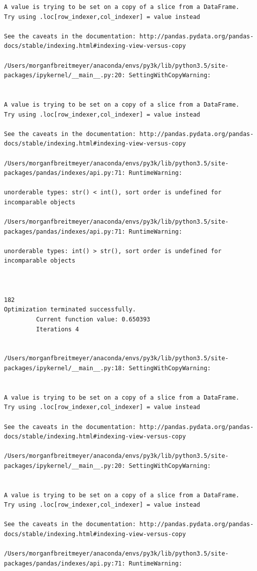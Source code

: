\begin{lstlisting}
A value is trying to be set on a copy of a slice from a DataFrame.
Try using .loc[row_indexer,col_indexer] = value instead

See the caveats in the documentation: http://pandas.pydata.org/pandas-docs/stable/indexing.html#indexing-view-versus-copy

/Users/morganfbreitmeyer/anaconda/envs/py3k/lib/python3.5/site-packages/ipykernel/__main__.py:20: SettingWithCopyWarning:


A value is trying to be set on a copy of a slice from a DataFrame.
Try using .loc[row_indexer,col_indexer] = value instead

See the caveats in the documentation: http://pandas.pydata.org/pandas-docs/stable/indexing.html#indexing-view-versus-copy

/Users/morganfbreitmeyer/anaconda/envs/py3k/lib/python3.5/site-packages/pandas/indexes/api.py:71: RuntimeWarning:

unorderable types: str() < int(), sort order is undefined for incomparable objects

/Users/morganfbreitmeyer/anaconda/envs/py3k/lib/python3.5/site-packages/pandas/indexes/api.py:71: RuntimeWarning:

unorderable types: int() > str(), sort order is undefined for incomparable objects



182
Optimization terminated successfully.
         Current function value: 0.650393
         Iterations 4


/Users/morganfbreitmeyer/anaconda/envs/py3k/lib/python3.5/site-packages/ipykernel/__main__.py:18: SettingWithCopyWarning:


A value is trying to be set on a copy of a slice from a DataFrame.
Try using .loc[row_indexer,col_indexer] = value instead

See the caveats in the documentation: http://pandas.pydata.org/pandas-docs/stable/indexing.html#indexing-view-versus-copy

/Users/morganfbreitmeyer/anaconda/envs/py3k/lib/python3.5/site-packages/ipykernel/__main__.py:20: SettingWithCopyWarning:


A value is trying to be set on a copy of a slice from a DataFrame.
Try using .loc[row_indexer,col_indexer] = value instead

See the caveats in the documentation: http://pandas.pydata.org/pandas-docs/stable/indexing.html#indexing-view-versus-copy

/Users/morganfbreitmeyer/anaconda/envs/py3k/lib/python3.5/site-packages/pandas/indexes/api.py:71: RuntimeWarning:


\end{lstlisting}
